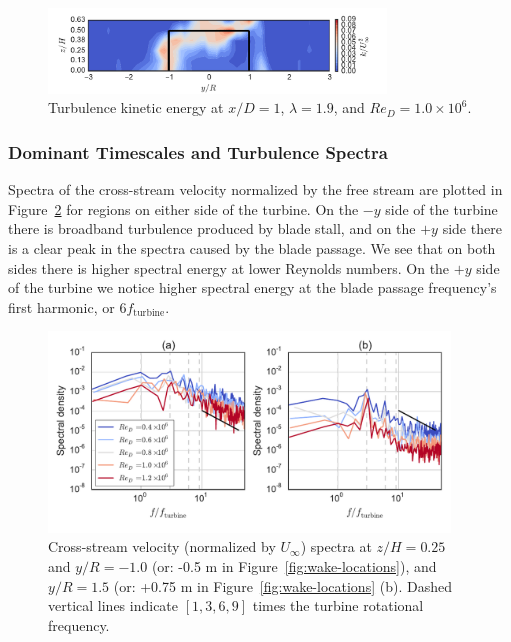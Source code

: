 \documentclass[energies,article,accept,moreauthors,pdftex,12pt,a4paper]{mdpi}
\begin{document}
\begin{figure}[ht!]
\centering
\includegraphics[width=0.8\textwidth]{figures/k_contours_10}
\caption{Turbulence kinetic energy at $x/D=1$, $\lambda=1.9$, and 
$Re_D=1.0 \times 10^6$.}
\label{fig:kcont}
\end{figure}


\subsubsection{Dominant Timescales and Turbulence Spectra}

Spectra of the cross-stream velocity normalized by the free stream are plotted
in Figure~\ref{fig:wake-spectra} for regions on either side of the turbine. On
the $-y$ side of the turbine there is broadband turbulence produced by blade
stall, and on the $+y$ side there is a clear peak in the spectra caused by the
blade passage. We see that on both sides there is higher spectral energy at
lower Reynolds numbers. On the $+y$ side of the turbine we notice higher
spectral energy at the blade passage frequency's first harmonic, or $6
f_\mathrm{turbine}$.



\begin{figure}[ht!]
\centering
\includegraphics[width=0.95\textwidth]{figures/wake_spectra}
\caption{Cross-stream velocity (normalized by $U_\infty$) spectra at $z/H=0.25$ 
and $y/R=-1.0$ (or: -0.5 m in Figure~\ref{fig:wake-locations}), and  $y/R=1.5$ 
(or: +0.75 m in Figure~\ref{fig:wake-locations} (b). Dashed vertical
lines indicate $[1, 3, 6, 9]$ times the turbine rotational frequency.}
\label{fig:wake-spectra}
\end{figure}
\end{document}

